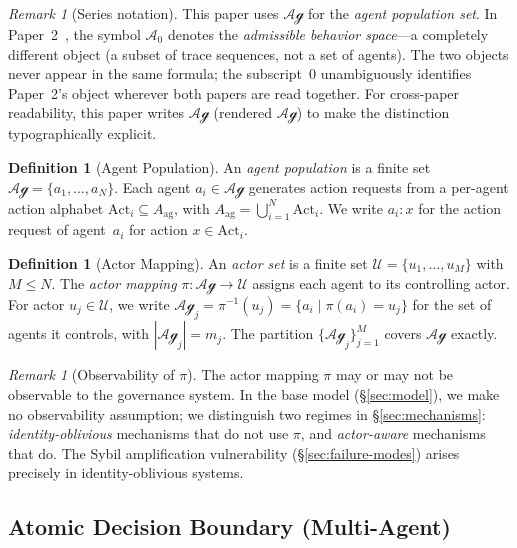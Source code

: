 \documentclass[11pt]{article}
\theoremstyle{plain}
\theoremstyle{definition}
\newtheorem{definition}[theorem]{Definition}
\theoremstyle{remark}
\newtheorem{remark}[theorem]{Remark}
\newcommand{\Agents}{\mathcal{Ag}}         %
\newcommand{\Actors}{\mathcal{U}}          %
\newcommand{\owner}{\pi}                   %
\begin{document}
\begin{remark}[Series notation]
\label{rem:notation-agents}
This paper uses $\Agents$ for the \emph{agent population set}.
In Paper~2~\citep{fernandez2026c}, the symbol $\mathcal{A}_0$ denotes
the \emph{admissible behavior space}---a completely different object
(a subset of trace sequences, not a set of agents).
The two objects never appear in the same formula; the subscript~$0$
unambiguously identifies Paper~2's object wherever both papers are read
together.  For cross-paper readability, this paper writes $\Agents$
(rendered $\mathcal{Ag}$) to make the distinction typographically
explicit.
\end{remark}

\begin{definition}[Agent Population]
\label{def:agents}
An \emph{agent population} is a finite set $\Agents = \{a_1, \ldots,
a_N\}$.  Each agent $a_i \in \Agents$ generates action requests
from a per-agent action alphabet $\mathrm{Act}_i \subseteq
A_{\mathrm{ag}}$, with $A_{\mathrm{ag}} = \bigcup_{i=1}^{N}
\mathrm{Act}_i$.  We write $a_i : x$ for the action request of
agent~$a_i$ for action $x \in \mathrm{Act}_i$.
\end{definition}

\begin{definition}[Actor Mapping]
\label{def:actors}
An \emph{actor set} is a finite set $\Actors = \{u_1, \ldots, u_M\}$
with $M \leq N$.  The \emph{actor mapping} $\owner : \Agents \to
\Actors$ assigns each agent to its controlling actor.  For actor
$u_j \in \Actors$, we write $\Agents_j = \owner^{-1}(u_j) = \{a_i
\mid \owner(a_i) = u_j\}$ for the set of agents it controls, with
$|\Agents_j| = m_j$.  The partition $\{\Agents_j\}_{j=1}^{M}$ covers
$\Agents$ exactly.
\end{definition}

\begin{remark}[Observability of $\owner$]
\label{rem:observability}
The actor mapping $\owner$ may or may not be observable to the
governance system.  In the base model (\S\ref{sec:model}), we make no
observability assumption; we distinguish two regimes in
\S\ref{sec:mechanisms}: \emph{identity-oblivious} mechanisms that do
not use $\owner$, and \emph{actor-aware} mechanisms that do.  The
Sybil amplification vulnerability (\S\ref{sec:failure-modes}) arises
precisely in identity-oblivious systems.
\end{remark}

\subsection{Atomic Decision Boundary (Multi-Agent)}
\label{sec:boundary-multi}
\end{document}
